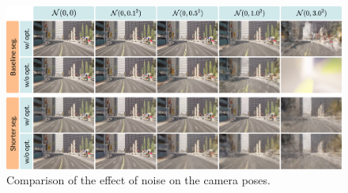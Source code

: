 \begin{figure}[!h]
    \centering
    \includegraphics[width=1.0\textwidth]{figures/noise-combined-comparison.png}
    \caption[Qualitative assessment of NeRF trained on noisy dataset.]{Comparison of the effect of noise on the camera poses.}
    \label{fig:noise-combined-comparison}
\end{figure}